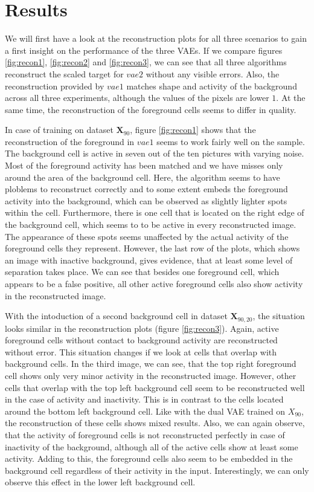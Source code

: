 \documentclass[12pt]{report}
\theoremstyle{definition}
\begin{document}
\section{Results}
We will first have a look at the reconstruction plots for all three scenarios to gain a first insight on the performance of the three VAEs.
If we compare figures \ref{fig:recon1}, \ref{fig:recon2} and \ref{fig:recon3}, we can see that all three algorithms reconstruct the scaled target for $vae2$ without any visible errors. Also, the reconstruction provided by $vae1$ matches shape and activity of the background across all three experiments, although the values of the pixels are lower $1$. At the same time, the reconstruction of the foreground cells seems to differ in quality. 

In case of training on dataset $\mathbf{X}_{90}$, figure \ref{fig:recon1} shows that the reconstruction of the foreground in $vae1$ seems to work fairly well on the sample. The background cell is active in seven out of the ten pictures with varying noise. Most of the foreground activity has been matched and we have misses only around the area of the background cell. Here, the algorithm seems to have ploblems to reconstruct correctly and to some extent embeds the foreground activity into the background, which can be observed as slightly lighter spots within the cell. Furthermore, there is one cell that is located on the right edge of the background cell, which seems to to be active in every reconstructed image. The appearance of these spots seems unaffected by the actual activity of the foreground cells they represent. However, the last row of the plots, which shows an image with inactive background, gives evidence, that at least some level of separation takes place. We can see that besides one foreground cell, which appears to be a false positive, all other active foreground cells also show activity in the reconstructed image.

With the intoduction of a second background cell in dataset $\mathbf{X}_{90, 20}$, the situation looks similar in the reconstruction plots (figure \ref{fig:recon3}). Again, active foreground cells without contact to background activity are reconstructed without error. This situation changes if we look at cells that overlap with background cells. In the third image, we can see, that the top right foreground cell shows only very minor activity in the reconstructed image. However, other cells that overlap with the top left background cell seem to be reconstructed well in the case of activity and inactivity. This is in contrast to the cells located around the bottom left background cell. Like with the dual VAE trained on $X_{90}$, the reconstruction of these cells shows mixed results. Also, we can again observe, that the activity of foreground cells is not reconstructed perfectly in case of inactivity of the background, although all of the active cells show at least some activity. Adding to this, the foreground cells also seem to be embedded in the background cell regardless of their activity in the input. Interestingly, we can only observe this effect in the lower left background cell.
\end{document}
